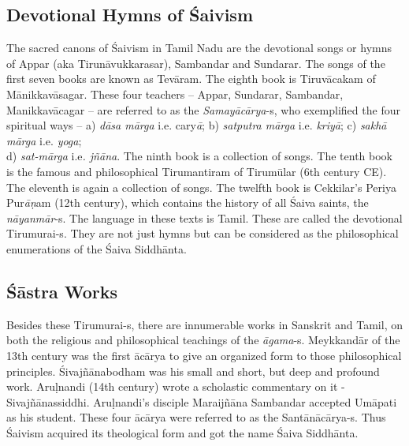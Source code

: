 \subsection*{Devotional Hymns of Śaivism}

\vskip -4pt

The sacred canons of Śaivism in Tamil Nadu are the devotional songs or hymns of Appar (aka Tirunāvukkarasar), Sambandar and Sundarar. The songs of the first seven books are known as Tevāram. The eighth book is Tiruvācakam of Mānikkavāsagar. These four teachers – Appar, Sundarar, Sambandar, Manikkavācagar -- are referred to as the \textit{Samayācārya}-s, who exemplified the four spiritual ways – a) \textit{dāsa mārga} i.e. cary\textit{ā}; b) \textit{satputra mārga} i.e. \textit{kriyā}; c) \textit{sakhā mārga} i.e. \textit{yoga};\\ d) \textit{sat-mārga} i.e\textit{. jñāna}. The ninth book is a collection of songs. The tenth book is the famous and philosophical Tirumantiram of Tirumūlar (6th century CE). The eleventh is again a collection of songs. The twelfth book is Cekkilar’s Periya Pur\textit{āṇ}am (12th century), which contains the history of all Śaiva saints, the \textit{nāyanmār}-s. The language in these texts is Tamil. These are called the devotional Tirumurai-s. They are not just hymns but can be considered as the philosophical enumerations of the Śaiva Siddhānta.


\subsection*{Śāstra Works}

\vskip -4pt

Besides these Tirumurai-s, there are innumerable works in Sanskrit and Tamil, on both the religious and philosophical teachings of the \textit{āgama}-s. Meykkandār of the 13th century was the first ācārya to give an organized form to those philosophical principles. Śivajñānabodham was his small and short, but deep and profound work. Aruḷnandi (14th century) wrote a scholastic commentary on it - Sivajñānassiddhi. Aruḷnandi’s disciple Maraijñāna Sambandar accepted Umāpati as his student. These four ācārya were referred to as the Santānācārya-s. Thus Śaivism acquired its theological form and got the name Śaiva Siddhānta.


